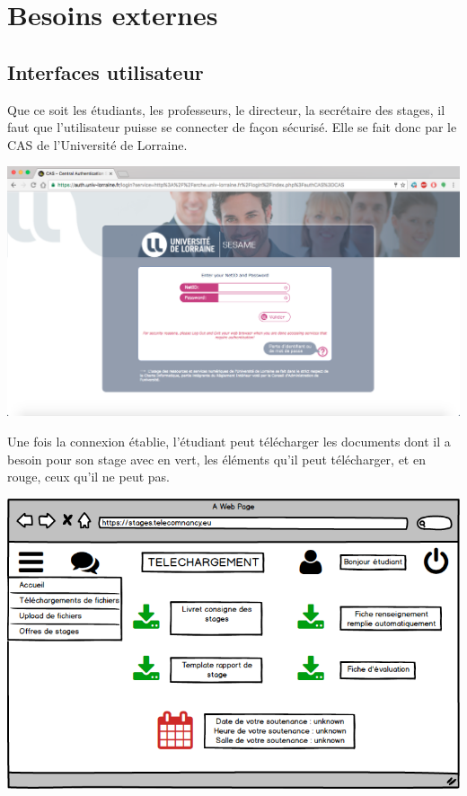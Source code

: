 \documentclass{scrreprt}
\begin{document}
\section{Besoins externes}
\subsection{Interfaces utilisateur}
Que ce soit les étudiants, les professeurs, le directeur, la secrétaire des stages, il faut que l'utilisateur puisse se connecter de façon sécurisé. Elle se fait donc par le CAS de l'Université de Lorraine.
\vspace{0.5cm}
\begin{center}
\includegraphics[scale=0.4]{image/CAS.png}
\end{center}
\vspace{3cm}
\begin{flushleft}
Une fois la connexion établie, l'étudiant peut télécharger les documents dont il a besoin pour son stage avec en vert, les éléments qu'il peut télécharger, et en rouge, ceux qu'il ne peut pas.
\end{flushleft}
\begin{center}
\includegraphics[scale=0.65]{image/DownloadEleve.png}
\end{center}
\end{document}
